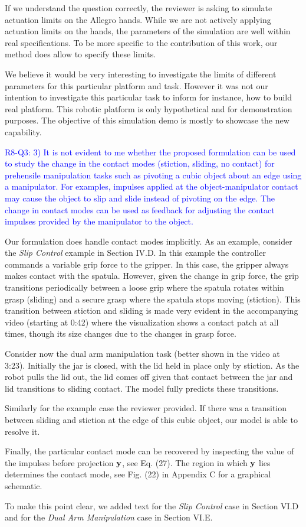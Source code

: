 If we understand the question correctly, the reviewer is asking to simulate
actuation limits on the Allegro hands. While we are not actively applying
actuation limits on the hands, the parameters of the simulation are well within
real specifications. To be more specific to the contribution of this work, our
method does allow to specify these limits. 

We believe it would be very interesting to investigate the limits of different
parameters for this particular platform and task. However it was not our
intention to investigate this particular task to inform for instance, how to
build real platform. This robotic platform is only hypothetical and for
demonstration purposes. The objective of this simulation demo is mostly to
showcase the new capability.

\vspace{5mm}
\textcolor{blue}{R8-Q3: 3) It is not evident to me whether the proposed
formulation can be used to study the change in the contact modes (stiction,
sliding, no contact) for prehensile manipulation tasks such as pivoting a cubic
object about an edge using a manipulator. For examples, impulses applied at the
object-manipulator contact may cause the object to slip and slide instead of
pivoting on the edge. The change in contact modes can be used as feedback for
adjusting the contact impulses provided by the manipulator to the object.}

Our formulation does handle contact modes implicitly. As an example, consider
the \emph{Slip Control} example in Section IV.D. In this example the controller
commands a variable grip force to the gripper. In this case, the gripper always
makes contact with the spatula. However, given the change in grip force, the
grip transitions periodically between a loose grip where the spatula rotates
within grasp (sliding) and a secure grasp where the spatula stops moving
(stiction). This transition between stiction and sliding is made very evident in
the accompanying video (starting at 0:42) where the visualization shows a
contact patch at all times, though its size changes due to the changes in grasp
force.

Consider now the dual arm manipulation task (better shown in the video at 3:23).
Initially the jar is closed, with the lid held in place only by stiction. As the
robot pulls the lid out, the lid comes off given that contact between the jar
and lid transitions to sliding contact. The model fully predicts these
transitions.

Similarly for the example case the reviewer provided. If there was a transition
between sliding and stiction at the edge of this cubic object, our model is able
to resolve it. 

Finally, the particular contact mode can be recovered by inspecting the value of
the impulses before projection ${\mathbf{y}}$, see Eq. (27). The region in which
${\mathbf{y}}$ lies determines the contact mode, see Fig. (22) in Appendix C for a
graphical schematic.

To make this point clear, we added text for the \emph{Slip Control} case in
Section VI.D and for the \emph{Dual Arm Manipulation} case in Section VI.E.
